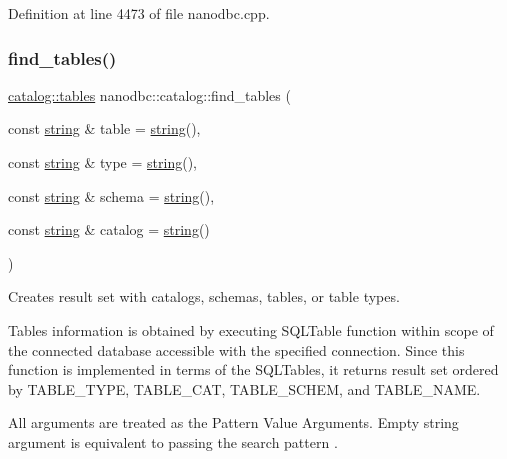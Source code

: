 Definition at line 4473 of file nanodbc.\+cpp.

\mbox{\label{classnanodbc_1_1catalog_a8271eae78585043dfb59c85cc2e361f5}} 
\subsubsection{\texorpdfstring{find\_tables()}{find\_tables()}}
{\footnotesize\ttfamily \mbox{\hyperlink{classnanodbc_1_1catalog_1_1tables}{catalog\+::tables}} nanodbc\+::catalog\+::find\+\_\+tables (\begin{DoxyParamCaption}\item[{const \mbox{\hyperlink{namespacenanodbc_abfc0ece56278e590911ec8352774c212}{string}} \&}]{table = {\ttfamily \mbox{\hyperlink{namespacenanodbc_abfc0ece56278e590911ec8352774c212}{string}}()},  }\item[{const \mbox{\hyperlink{namespacenanodbc_abfc0ece56278e590911ec8352774c212}{string}} \&}]{type = {\ttfamily \mbox{\hyperlink{namespacenanodbc_abfc0ece56278e590911ec8352774c212}{string}}()},  }\item[{const \mbox{\hyperlink{namespacenanodbc_abfc0ece56278e590911ec8352774c212}{string}} \&}]{schema = {\ttfamily \mbox{\hyperlink{namespacenanodbc_abfc0ece56278e590911ec8352774c212}{string}}()},  }\item[{const \mbox{\hyperlink{namespacenanodbc_abfc0ece56278e590911ec8352774c212}{string}} \&}]{catalog = {\ttfamily \mbox{\hyperlink{namespacenanodbc_abfc0ece56278e590911ec8352774c212}{string}}()} }\end{DoxyParamCaption})}



Creates result set with catalogs, schemas, tables, or table types. 

Tables information is obtained by executing {\ttfamily S\+Q\+L\+Table} function within scope of the connected database accessible with the specified connection. Since this function is implemented in terms of the {\ttfamily S\+Q\+L\+Table}s, it returns result set ordered by T\+A\+B\+L\+E\+\_\+\+T\+Y\+PE, T\+A\+B\+L\+E\+\_\+\+C\+AT, T\+A\+B\+L\+E\+\_\+\+S\+C\+H\+EM, and T\+A\+B\+L\+E\+\_\+\+N\+A\+ME.

All arguments are treated as the Pattern Value Arguments. Empty string argument is equivalent to passing the search pattern \textquotesingle{}\textquotesingle{}. 

